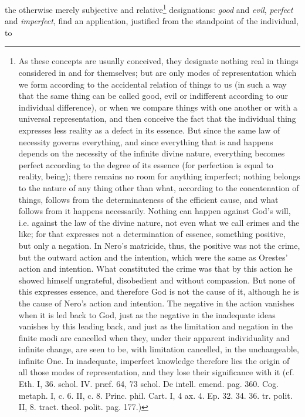 \documentclass[12pt,a4paper,openany]{book}
\newcommand{\opage}[1]{\marginnote{\footnotesize\textit{[#1]}}}
\begin{document}
the otherwise merely subjective and relative\footnote{As these concepts are usually conceived, they designate nothing
real in things considered in and for themselves; but are only modes
of representation which we form according to the accidental relation of things to us (in
such a way that the same thing can be called good, evil or indifferent according to
our individual difference), or when we compare things
with one another or with a universal representation, and then conceive the fact
that the individual thing expresses less reality as a defect in its
essence. But since the same law of necessity governs everything,
and since everything that is and happens depends on the necessity of the infinite
divine nature, everything becomes perfect according to
the degree of its essence (for perfection is equal to reality, being); there
remains no room for anything imperfect; nothing belongs to the nature
of any thing other than what, according to the concatenation of things,
follows from the determinateness of the efficient cause, and what follows from
it happens necessarily. Nothing can happen against God's will, i.e.
against the law of the divine nature, not even what we call
crimes and the like; for that expresses not a determination of essence,
something positive, but only a negation. In Nero's matricide,
thus, the positive was not the crime, but the outward action and
the intention, which were the same as Orestes' action and intention. What
constituted the crime was that by this action he
showed himself ungrateful, disobedient and without compassion. But none of
this expresses essence, and therefore God is not the cause of it, although
he is the cause of Nero's action and intention. The negative in the
action vanishes when it is led back to God, just as the negative
in the inadequate ideas vanishes by this leading back, and
just as the limitation and negation in the finite modi are cancelled
when they, under their apparent individuality and infinite
change, are seen to be, with limitation cancelled, in the unchangeable,
infinite One. In inadequate, imperfect knowledge
therefore lies the origin of all those modes of representation, and they lose
their significance with it (cf. Eth. I, 36. schol. IV. præf. 64, 73
schol. De intell. emend. pag. 360. Cog. metaph. I, c. 6. II, c. 8.
Princ. phil. Cart. I, 4 ax. 4. Ep. 32. 34. 36. tr. polit. II, 8. tract.
theol. polit. pag. 177.)} designations:
\opage{124}\setcounter{footnote}{0}\emph{good} and \emph{evil}, \emph{perfect} and \emph{imperfect}, find
an application, justified from the standpoint of the individual, to
\end{document}
